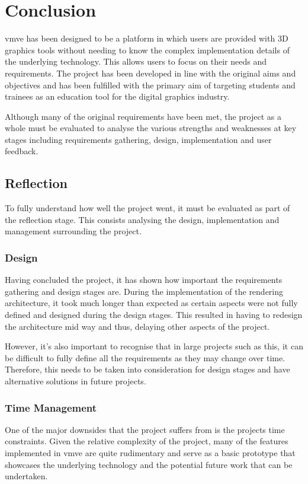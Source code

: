 \documentclass[11pt]{article}
\begin{document}
\clearpage
\section{Conclusion} \label{conclusion}

\gls*{vmve} has been designed to be a platform in which users are provided with
3D graphics tools without needing to know the complex implementation details of
the underlying technology. This allows users to focus on their needs and
requirements. The project has been developed in line with the original aims and
objectives and has been fulfilled with the primary aim of targeting students
and trainees as an education tool for the digital graphics industry.


Although many of the original requirements have been met, the project as a whole
must be evaluated to analyse the various strengths and weaknesses at key stages
including requirements gathering, design, implementation and user feedback.

\subsection{Reflection}
To fully understand how well the project went, it must be evaluated as part of
the reflection stage. This consists analysing the design, implementation and 
management surrounding the project.

\subsubsection{Design}
Having concluded the project, it has shown how important the requirements
gathering and design stages are. During the implementation of the rendering
architecture, it took much longer than expected as certain aspects were not
fully defined and designed during the design stages. This resulted in having to
redesign the architecture mid way and thus, delaying other aspects of the
project.

However, it's also important to recognise that in large projects such as this,
it can be difficult to fully define all the requirements as they may change over
time. Therefore, this needs to be taken into consideration for design stages and
have alternative solutions in future projects.

\subsubsection{Time Management}
One of the major downsides that the project suffers from is the projects time
constraints. Given the relative complexity of the project, many of the features
implemented in \gls*{vmve} are quite rudimentary and serve as a basic prototype
that showcases the underlying technology and the potential future work that can
be undertaken.
\end{document}
